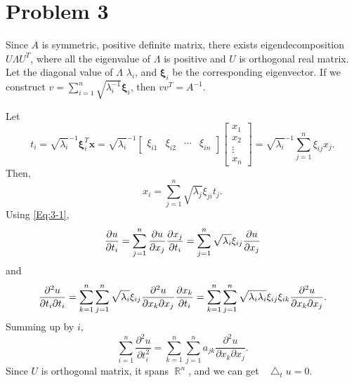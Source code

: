 \documentclass{article}
\DeclareMathOperator{\rr}{\mathbb{R}}
\newcommand*\Laplace{\mathop{}\!\mathbin\bigtriangleup}
\begin{document}
\section*{Problem 3}
Since $A$ is symmetric, positive definite matrix, there exists eigendecomposition $U\Lambda U^T$, where all the eigenvalue of $\Lambda$ is positive and $U$ is orthogonal real matrix. Let the diagonal value of $\Lambda$ $\lambda_i$, and $\bm{\xi}_i$ be the corresponding eigenvector. If we construct $v=\sum_{i=1}^n \sqrt{\lambda_i^{-1}}\bm{\xi}_i$, then $vv^T=A^{-1}$.

Let 
\begin{equation*}
t_i=\sqrt{\lambda_i}^{-1} \bm{\xi}_i^T \bm{x}=\sqrt{\lambda_i}^{-1}\begin{bmatrix}
\xi_{i1} & \xi_{i2} & \cdots &\xi_{in}
\end{bmatrix}
\begin{bmatrix}
x_{1} \\ x_{2} \\ \vdots \\ x_{n}
\end{bmatrix}=\sqrt{\lambda_i}^{-1}\sum\limits_{j=1}^n \xi_{ij}x_j.
\end{equation*}
Then,
\begin{equation}\label{Eq:3-1}
x_i=\sum\limits_{j=1}^n \sqrt{\lambda_j}\xi_{ji}t_j.
\end{equation}
Using \eqref{Eq:3-1}, 
\begin{equation*}
\pdv{u}{t_i}=\sum_{j=1}^n \pdv{u}{x_j}\pdv{x_j}{t_i}=\sum_{j=1}^n \sqrt{\lambda_i}\xi_{ij}\pdv{u}{x_j}
\end{equation*}
and
\begin{equation*}
\frac{\partial^2 u}{\partial t_i \partial t_i}=\sum_{k=1}^n \sum_{j=1}^n \sqrt{\lambda_i}\xi_{ij}\frac{\partial^2 u}{\partial x_k \partial x_j}\pdv{x_k}{t_i}=\sum_{k=1}^n \sum_{j=1}^n \sqrt{\lambda_i\lambda_i}\xi_{ij}\xi_{ik}\frac{\partial^2 u}{\partial x_k \partial x_j}.
\end{equation*}
Summing up by $i$,
\begin{equation*}
\sum\limits_{i=1}^n\frac{\partial^2 u}{\partial t_i^2}=\sum_{k=1}^n \sum_{j=1}^n a_{jk}\frac{\partial^2 u}{\partial x_k \partial x_j}.
\end{equation*}
Since $U$ is orthogonal matrix, it spans $\rr^n$, and we can get $\Laplace_t u=0$.
\end{document}
